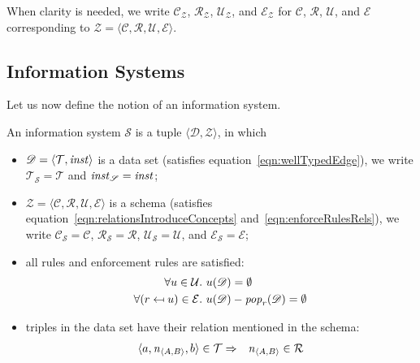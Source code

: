 \documentclass[runningheads]{llncs}
\newcommand{\id}[1]{\text{\it #1\/}}
\newcommand{\popF}[1]{\id{pop}_{#1}}
\newcommand{\pop}[2]{\popF{#1}(#2)}
\newcommand{\instance}{\mathbin{\id{inst}}}
\newcommand{\viol}[2]{{#1}(#2)}
\newcommand{\declare}[3]{\id{#1}_{\pair{#2}{#3}}}
\newcommand{\pair}[2]{\langle{#1},{#2}\rangle}
\newcommand{\triple}[3]{\langle{#1},{#2},{#3}\rangle}
\newcommand{\quadruple}[4]{\langle{#1},{#2},{#3},{#4}\rangle}
\newcommand{\concepts}{\mathcal{C}}
\newcommand{\rels}{\mathcal{R}}   %
\newcommand{\triples}{\mathcal{T}}
\newcommand{\enforces}{\mathcal{E}}
\newcommand{\rules}{\mathcal{U}}
\newcommand{\dataset}{\mathscr{D}}
\newcommand{\schema}{\mathscr{Z}}
\newcommand{\infsys}{\mathscr{S}}
\def\define#1{\label{dfn:#1}{\em #1}\index{#1}}
\begin{document}
   When clarity is needed, we write $\concepts_{\schema}$, $\rels_{\schema}$, $\rules_{\schema}$, and $\enforces_{\schema}$
   for $\concepts$, $\rels$, $\rules$, and $\enforces$ corresponding to $\schema = \quadruple{\concepts}{\rels}{\rules}{\enforces}$.

\subsection{Information Systems}
\label{sct:Information Systems}
   Let us now define the notion of an information system.
\begin{definition}
\label{def:information system}
\item An information system $\infsys$ is a tuple $\pair{\dataset}{\schema}$, in which
\begin{itemize}
   \item $\dataset=\pair{\triples}{\instance}$ is a data set (satisfies equation~\ref{eqn:wellTypedEdge}), we write $\triples_\infsys = \triples$ and $\instance_\infsys = \instance$;
   \item $\schema=\quadruple{\concepts}{\rels}{\rules}{\enforces}$ is a schema (satisfies equation~\ref{eqn:relationsIntroduceConcepts} and~\ref{eqn:enforceRulesRels}), we write $\concepts_\infsys = \concepts$, $\rels_\infsys = \rels$, $\rules_\infsys=\rules$, and $\enforces_\infsys=\enforces$;
   \item all rules and enforcement rules are satisfied:
   \begin{align}
   \forall u\in\rules&.~\viol{u}{\dataset}=\emptyset\\
   \forall (r\mapsfrom u)\in\enforces&.~\viol{u}{\dataset} - \pop{r}{\dataset}=\emptyset
   \label{eqn:satisfaction}
   \end{align}
   \item triples in the data set have their relation mentioned in the schema:
   \begin{eqnarray}
   \triple{a}{\declare{n}{A}{B}}{b}\in\triples&\Rightarrow&\declare{n}{A}{B}\in\rels
   \label{eqn:define R}
   \end{eqnarray}
\end{itemize}
\end{definition}
\end{document}
